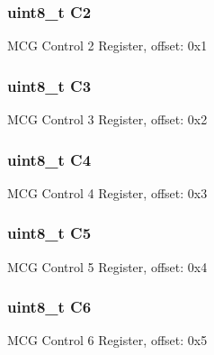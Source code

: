 \subsubsection[{C2}]{\setlength{\rightskip}{0pt plus 5cm}uint8\+\_\+t C2}\label{struct_m_c_g___mem_map_acdf8ac8ab339152eaed13f4eca300aa5}
M\+C\+G Control 2 Register, offset\+: 0x1 \hypertarget{struct_m_c_g___mem_map_a328e95cb4deb2dd724cb8b26a5ab381b}{}
\subsubsection[{C3}]{\setlength{\rightskip}{0pt plus 5cm}uint8\+\_\+t C3}\label{struct_m_c_g___mem_map_a328e95cb4deb2dd724cb8b26a5ab381b}
M\+C\+G Control 3 Register, offset\+: 0x2 \hypertarget{struct_m_c_g___mem_map_a9ecb3242c606bc219190b4cb4f64600f}{}
\subsubsection[{C4}]{\setlength{\rightskip}{0pt plus 5cm}uint8\+\_\+t C4}\label{struct_m_c_g___mem_map_a9ecb3242c606bc219190b4cb4f64600f}
M\+C\+G Control 4 Register, offset\+: 0x3 \hypertarget{struct_m_c_g___mem_map_ac0242981a4c4bd9ccd00b67970943978}{}
\subsubsection[{C5}]{\setlength{\rightskip}{0pt plus 5cm}uint8\+\_\+t C5}\label{struct_m_c_g___mem_map_ac0242981a4c4bd9ccd00b67970943978}
M\+C\+G Control 5 Register, offset\+: 0x4 \hypertarget{struct_m_c_g___mem_map_a64bf696a1420e91b19a0fc0b29311e5b}{}
\subsubsection[{C6}]{\setlength{\rightskip}{0pt plus 5cm}uint8\+\_\+t C6}\label{struct_m_c_g___mem_map_a64bf696a1420e91b19a0fc0b29311e5b}
M\+C\+G Control 6 Register, offset\+: 0x5 \hypertarget{struct_m_c_g___mem_map_af43b800cd7ef121b64ecb21279141911}{}
